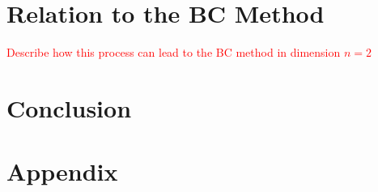 \documentclass[12pt]{article}
\begin{document}
\section{Relation to the BC Method}

\textcolor{red}{Describe how this process can lead to the BC method in dimension $n=2$}


\section{Conclusion}


\appendix
\section{Appendix}




\end{document}
